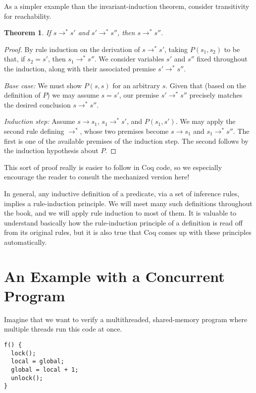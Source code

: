 \documentclass{amsbook}
\newtheorem{theorem}{Theorem}[chapter]
\theoremstyle{definition}
\theoremstyle{remark}
\numberwithin{section}{chapter}
\numberwithin{equation}{chapter}
\begin{document}
As a simpler example than the invariant-induction theorem, consider transitivity for reachability.

\begin{theorem}
  If $s \to^* s'$ and $s' \to^* s''$, then $s \to^* s''$.
\end{theorem}
\begin{proof}
  By rule induction on the derivation of $s \to^* s'$, taking $P(s_1, s_2)$ to be that, if $s_2 = s'$, then $s_1 \to^* s''$.  We consider variables $s'$ and $s''$ fixed throughout the induction, along with their associated premise $s' \to^* s''$.

  \emph{Base case:} We must show $P(s, s)$ for an arbitrary $s$.  Given that (based on the definition of $P$) we may assume $s = s'$, our premise $s' \to^* s''$ precisely matches the desired conclusion $s \to^* s''$.

  \emph{Induction step:} Assume $s \to s_1$, $s_1 \to^* s'$, and $P(s_1, s')$.  We may apply the second rule defining $\to^*$, whose two premises become $s \to s_1$ and $s_1 \to^* s''$.  The first is one of the available premises of the induction step.  The second follows by the induction hypothesis about $P$.
\end{proof}

This sort of proof really is easier to follow in Coq code, so we especially encourage the reader to consult the mechanized version here!

In general, any inductive definition of a predicate, via a set of inference rules, implies a rule-induction principle.
We will meet many such definitions throughout the book, and we will apply rule induction to most of them.
It is valuable to understand basically how the rule-induction principle of a definition is read off from its original rules, but it is also true that Coq comes up with these principles automatically.


\section{An Example with a Concurrent Program}

Imagine that we want to verify a multithreaded, shared-memory program where multiple threads run this code at once.
\begin{verbatim}
f() {
  lock();
  local = global;
  global = local + 1;
  unlock();
}
\end{verbatim}
\end{document}
